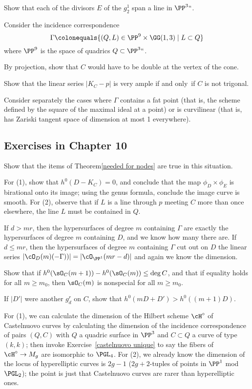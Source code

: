 Show that each of the divisors $E$ of the $g^1_2$ span a line in $\PP^3` `$.

Consider the incidence correspondence
$$
\Gamma \colonequals  \{ (Q, L) \in \PP^9 \times \GG(1,3) \mid L \subset Q \}
$$
where $\PP^9$ is the space of quadrics $Q\subset \PP^3` `$.

By projection, show that $C$ would have to be double at the vertex of the cone.

Show that the linear series $|K_C - p|$ is very ample if and only~if
$C$ is not trigonal.

Consider separately the cases where $\Gamma$ contains a fat point
%
(that is, the scheme defined by the square of the maximal ideal at a
point) or is
curvilinear
%
(that is, has Zariski tangent space of
dimension at most 1 everywhere).

\subsection*{Exercises in Chapter 10\nopunct}

Show that the items of Theorem\ref{needed for nodes}  are true in this
situation.

For (1), show that $h^0(D - K_C) = 0$, and conclude
that the map $\phi_D \times \phi_E$ is birational onto its image;
using
the genus formula, conclude the image curve is smooth. For (2),
observe that if $L$ is a line through $p$ meeting $C$ more than
once elsewhere, the line $L$ must be contained in $Q$.

If $d > mr$, then the hypersurfaces of degree $m$ containing
$\Gamma$ are exactly the hypersurfaces of degree $m$ containing $D$,
and we know how many there are. If $d \leq mr$, then the hypersurfaces
of degree $m$ containing $\Gamma$ cut out on $D$ the linear series
$|\cO_D(m)(-\Gamma))| = |\cO_{\PP^1}(mr-d)|$ and again we know the
dimension.

Show that if $h^{0}(\sO_{C}(m+1))-h^{0}(\sO_{C}(m)) \leq \deg C$,
and that if equality holds for
all $m\geq m_{0}$, then $\sO_{C}(m) $ is nonspecial for all $m\geq m_{0}$.

If $|D'|$ were another $g^r_d$ on $C$, show that $h^0(mD + D') > h^0((m+1)D)$.

For (1), we can calculate the dimension of the Hilbert scheme $\cH^\circ$ of
Castelnuovo curves
%
by calculating the dimension
of the incidence correspondence of pairs $(Q, C)$ with $Q$ a quadric
surface in $\PP^3$ and $C \subset Q$ a curve of type $(k,k)$; then invoke
Exercise~\ref{castelnuovo unique} to say the fibers of $\cH^\circ \to
M_g$ are isomorphic to
%
%
$\PGL_4$.
For (2), we already know the
dimension of the locus of hyperelliptic curves is $2g-1$ ($2g+2$-tuples
of points in $\PP^1$ mod $\PGL_2$); the point is just that Castelnuovo
curves are rarer than hyperelliptic ones.

